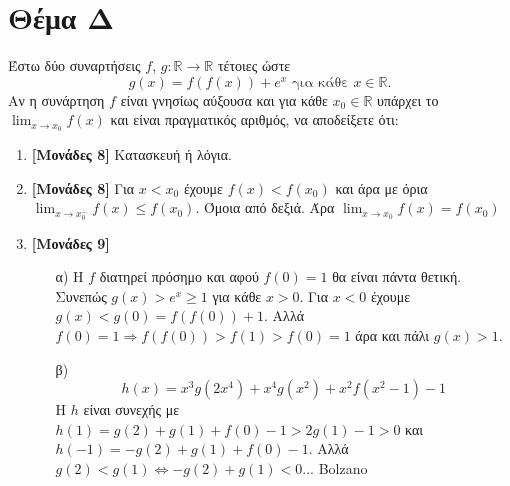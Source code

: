 \documentclass[12pt]{article}
\begin{document}
  \section*{Θέμα Δ}
    \noindent
    Έστω δύο συναρτήσεις $f$, $g:\mathbb{R}\to\mathbb{R}$ τέτοιες ώστε $$g(x)=f\left(f(x)\right)+e^x \text{ για κάθε } x\in\mathbb{R}.$$
    Αν η συνάρτηση $f$ είναι γνησίως αύξουσα και για κάθε $x_0\in\mathbb{R}$ υπάρχει το $\lim_{x\to x_0}f(x)$ και είναι πραγματικός αριθμός, να αποδείξετε ότι:
    \begin{enumerate}
      \item \textbf{[Μονάδες 8]} Κατασκευή ή λόγια.
      \item \textbf{[Μονάδες 8]} Για $x<x_0$ έχουμε $f(x)<f(x_0)$ και άρα με όρια $\lim_{x\to x_0^-}f(x)\le f(x_0)$. Όμοια από δεξιά. Άρα $\lim_{x\to x_0}f(x)=f(x_0)$
      \item \textbf{[Μονάδες 9]}
      \begin{enumerate}
        \item [α)] Η $f$ διατηρεί πρόσημο και αφού $f(0)=1$ θα είναι πάντα θετική. Συνεπώς $g(x) > e^x \ge 1$ για κάθε $x>0$. Για $x<0$ έχουμε $g(x)<g(0)=f(f(0))+1$. Αλλά $f(0)=1 \Rightarrow f(f(0))>f(1)>f(0)=1$ άρα και πάλι $g(x)>1$.
        \item [β)] $$h(x) = x^3g\left(2x^4\right)+x^4g\left(x^2\right)+x^2f\left(x^2-1\right)-1$$ Η $h$ είναι συνεχής με $h(1)=g(2)+g(1)+f(0)-1> 2g(1)-1>0$ και $h(-1)=-g(2)+g(1)+f(0)-1$. Αλλά $g(2)<g(1) \iff -g(2)+g(1)<0$... Bolzano
      \end{enumerate}
    \end{enumerate}

\vspace{3\baselineskip}
\end{document}
